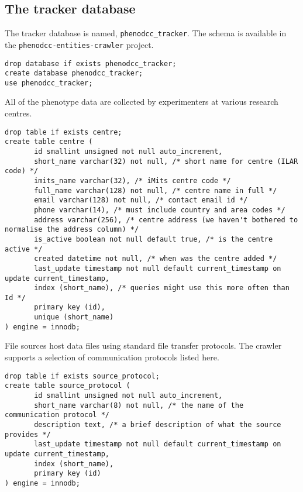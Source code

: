 \documentclass[a4paper,11pt]{article}
\begin{document}
\begin{landscape}

\section{The tracker database}

The tracker database is named, {\tt phenodcc\_tracker}. The schema is available in the {\tt phenodcc-entities-crawler} project.

\begin{Verbatim}[fontsize=\small,formatcom=\color{blue}]
drop database if exists phenodcc_tracker;
create database phenodcc_tracker;
use phenodcc_tracker;
\end{Verbatim}

All of the phenotype data are collected by experimenters at various research centres.

\begin{Verbatim}[fontsize=\small,formatcom=\color{blue}]
drop table if exists centre;
create table centre (
       id smallint unsigned not null auto_increment,
       short_name varchar(32) not null, /* short name for centre (ILAR code) */
       imits_name varchar(32), /* iMits centre code */
       full_name varchar(128) not null, /* centre name in full */
       email varchar(128) not null, /* contact email id */
       phone varchar(14), /* must include country and area codes */
       address varchar(256), /* centre address (we haven't bothered to normalise the address column) */
       is_active boolean not null default true, /* is the centre active */
       created datetime not null, /* when was the centre added */
       last_update timestamp not null default current_timestamp on update current_timestamp,
       index (short_name), /* queries might use this more often than Id */
       primary key (id),
       unique (short_name)
) engine = innodb;
\end{Verbatim}

File sources host data files using standard file transfer protocols. The crawler supports a selection of communication protocols listed here.

\begin{Verbatim}[fontsize=\small,formatcom=\color{blue}]
drop table if exists source_protocol;
create table source_protocol (
       id smallint unsigned not null auto_increment,
       short_name varchar(8) not null, /* the name of the communication protocol */
       description text, /* a brief description of what the source provides */
       last_update timestamp not null default current_timestamp on update current_timestamp,
       index (short_name),
       primary key (id)
) engine = innodb;
\end{Verbatim}


\end{landscape}
\end{document}
